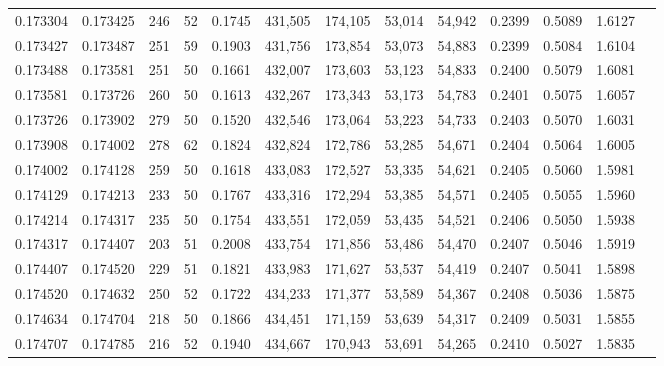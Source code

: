 \begin{tabular}{rrrrrrrrrrrrr}
0.173304 & 0.173425 &   246 &  52 &                                     0.1745 & 431,505 & 174,105 &  53,014 &  54,942 & 0.2399 & 0.5089 & 1.6127 \\
0.173427 & 0.173487 &   251 &  59 &                                     0.1903 & 431,756 & 173,854 &  53,073 &  54,883 & 0.2399 & 0.5084 & 1.6104 \\
0.173488 & 0.173581 &   251 &  50 &                                     0.1661 & 432,007 & 173,603 &  53,123 &  54,833 & 0.2400 & 0.5079 & 1.6081 \\
0.173581 & 0.173726 &   260 &  50 &                                     0.1613 & 432,267 & 173,343 &  53,173 &  54,783 & 0.2401 & 0.5075 & 1.6057 \\
0.173726 & 0.173902 &   279 &  50 &                                     0.1520 & 432,546 & 173,064 &  53,223 &  54,733 & 0.2403 & 0.5070 & 1.6031 \\
0.173908 & 0.174002 &   278 &  62 &                                     0.1824 & 432,824 & 172,786 &  53,285 &  54,671 & 0.2404 & 0.5064 & 1.6005 \\
0.174002 & 0.174128 &   259 &  50 &                                     0.1618 & 433,083 & 172,527 &  53,335 &  54,621 & 0.2405 & 0.5060 & 1.5981 \\
0.174129 & 0.174213 &   233 &  50 &                                     0.1767 & 433,316 & 172,294 &  53,385 &  54,571 & 0.2405 & 0.5055 & 1.5960 \\
0.174214 & 0.174317 &   235 &  50 &                                     0.1754 & 433,551 & 172,059 &  53,435 &  54,521 & 0.2406 & 0.5050 & 1.5938 \\
0.174317 & 0.174407 &   203 &  51 &                                     0.2008 & 433,754 & 171,856 &  53,486 &  54,470 & 0.2407 & 0.5046 & 1.5919 \\
0.174407 & 0.174520 &   229 &  51 &                                     0.1821 & 433,983 & 171,627 &  53,537 &  54,419 & 0.2407 & 0.5041 & 1.5898 \\
0.174520 & 0.174632 &   250 &  52 &                                     0.1722 & 434,233 & 171,377 &  53,589 &  54,367 & 0.2408 & 0.5036 & 1.5875 \\
0.174634 & 0.174704 &   218 &  50 &                                     0.1866 & 434,451 & 171,159 &  53,639 &  54,317 & 0.2409 & 0.5031 & 1.5855 \\
0.174707 & 0.174785 &   216 &  52 &                                     0.1940 & 434,667 & 170,943 &  53,691 &  54,265 & 0.2410 & 0.5027 & 1.5835 \\

\end{tabular}
